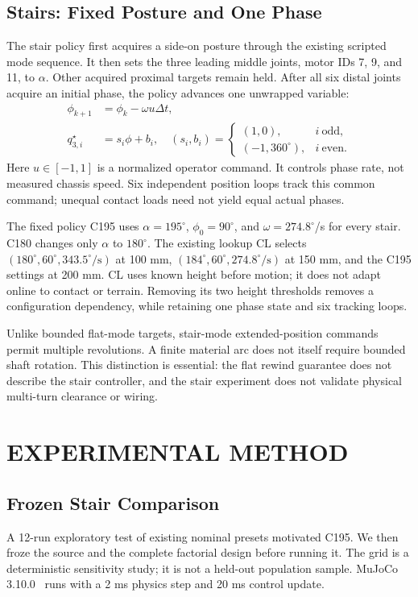 \documentclass[letterpaper,10pt,conference]{ieeeconf}
\begin{document}
\subsection{Stairs: Fixed Posture and One Phase}
The stair policy first acquires a side-on posture through the existing scripted mode sequence. It then sets the three leading middle joints, motor IDs 7, 9, and 11, to $\alpha$. Other acquired proximal targets remain held. After all six distal joints acquire an initial phase, the policy advances one unwrapped variable:
\begin{align}
 \phi_{k+1}&=\phi_k-\omega u\Delta t,\\
 q_{3,i}^\star&=s_i\phi+b_i,\quad
 (s_i,b_i)=\begin{cases}(1,0),&i\ \text{odd},\\(-1,360^\circ),&i\ \text{even}.\end{cases}
\end{align}
Here $u\in[-1,1]$ is a normalized operator command. It controls phase rate, not measured chassis speed. Six independent position loops track this common command; unequal contact loads need not yield equal actual phases.

The fixed policy C195 uses $\alpha=195^\circ$, $\phi_0=90^\circ$, and $\omega=274.8^\circ$/s for every stair. C180 changes only $\alpha$ to $180^\circ$. The existing lookup CL selects $(180^\circ,60^\circ,343.5^\circ/\mathrm{s})$ at 100 mm, $(184^\circ,60^\circ,274.8^\circ/\mathrm{s})$ at 150 mm, and the C195 settings at 200 mm. CL uses known height before motion; it does not adapt online to contact or terrain. Removing its two height thresholds removes a configuration dependency, while retaining one phase state and six tracking loops.

Unlike bounded flat-mode targets, stair-mode extended-position commands permit multiple revolutions. A finite material arc does not itself require bounded shaft rotation. This distinction is essential: the flat rewind guarantee does not describe the stair controller, and the stair experiment does not validate physical multi-turn clearance or wiring.

\section{EXPERIMENTAL METHOD}
\subsection{Frozen Stair Comparison}
A 12-run exploratory test of existing nominal presets motivated C195. We then froze the source and the complete factorial design before running it. The grid is a deterministic sensitivity study; it is not a held-out population sample. MuJoCo 3.10.0~\cite{todorov2012mujoco} runs with a 2 ms physics step and 20 ms control update.
\end{document}
